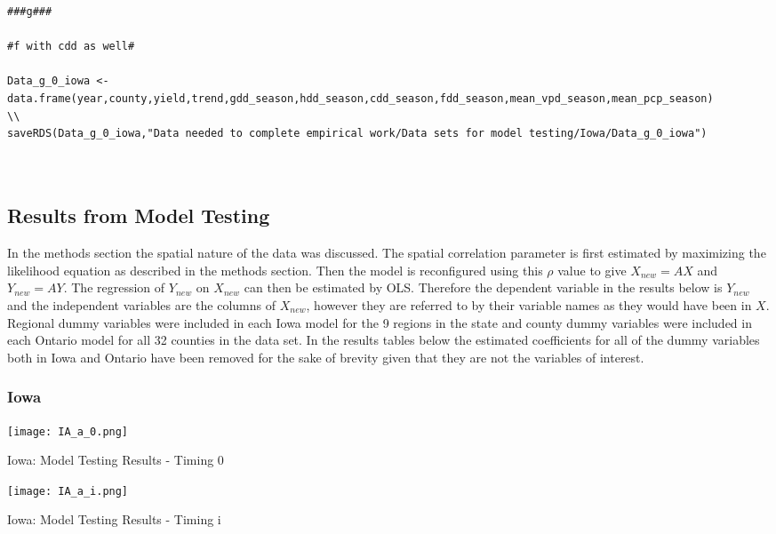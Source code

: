 \begin{lstlisting}
###g###

#f with cdd as well#

Data_g_0_iowa <- data.frame(year,county,yield,trend,gdd_season,hdd_season,cdd_season,fdd_season,mean_vpd_season,mean_pcp_season)
\\
saveRDS(Data_g_0_iowa,"Data needed to complete empirical work/Data sets for model testing/Iowa/Data_g_0_iowa")



\end{lstlisting}



\subsection{Results from Model Testing}

In the methods section the spatial nature of the data was discussed. The spatial correlation parameter is first estimated by maximizing the likelihood equation as described in the methods section. Then the model is reconfigured using this $\rho$ value to give $X_{new}=AX$ and $Y_{new}=AY$. The regression of $Y_{new}$ on $X_{new}$ can then be estimated by OLS. Therefore the dependent variable in the results below is $Y_{new}$ and the independent variables are the columns of $X_{new}$, however they are referred to by their variable names as they would have been in $X$. Regional dummy variables were included in each Iowa model for the 9 regions in the state and county dummy variables were included in each Ontario model for all 32 counties in the data set. In the results tables below the estimated coefficients for all of the dummy variables both in Iowa and Ontario have been removed for the sake of brevity given that they are not the variables of interest.

\subsubsection{Iowa}


 
\begin{table}[H]
    \centering
    \texttt{[image: IA\_a\_0.png]}
    \caption{Iowa: Model Testing Results - Timing 0}
    \label{fig:my_label}
\end{table}

 
\begin{table}[H]
    \centering
    \texttt{[image: IA\_a\_i.png]}
    \caption{Iowa: Model Testing Results - Timing i}
    \label{fig:my_label}
\end{table}

